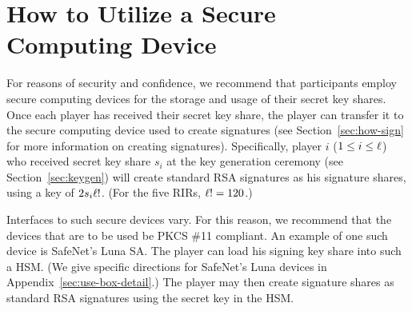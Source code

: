 \section{How to Utilize a Secure Computing Device}
\label{sec:use-box}

For reasons of security and confidence, we recommend that participants
employ secure computing devices for the storage and usage of their
secret key shares.  Once each player has received their secret key
share, the player can transfer it to the secure computing device used
to create signatures (see Section~\ref{sec:how-sign} for more
information on creating signatures). Specifically, player $i$ ($1 \leq
i \leq \ell$) who received secret key share $s_i$ at the key
generation ceremony (see Section~\ref{sec:keygen}) will create
standard RSA signatures as his signature shares, using a key of $2 s_i
\ell !$. (For the five RIRs, $\ell ! = 120$.) 

Interfaces to such secure devices vary. For this reason, we
recommend that the devices that are to be used be PKCS \#11
compliant. An example of one such device is SafeNet's Luna SA.  The
player can load his signing key share into such a HSM. (We give
specific directions for SafeNet's Luna devices in
Appendix~\ref{sec:use-box-detail}.) The player may then create
signature shares as standard RSA signatures using the secret key in
the HSM.
